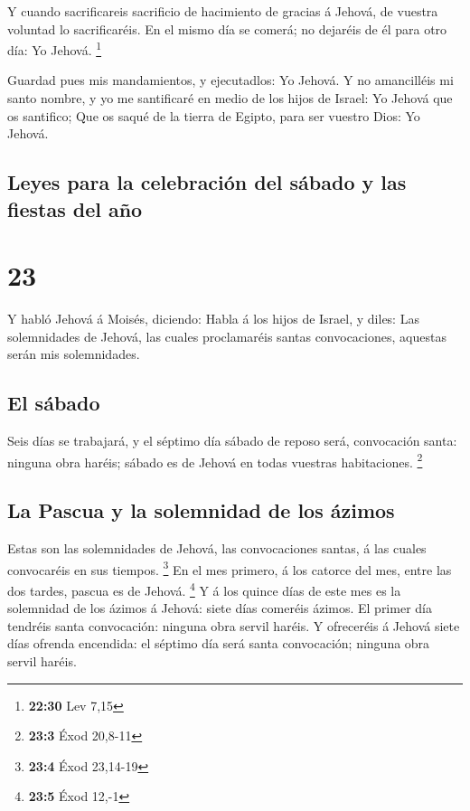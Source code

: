  Y cuando sacrificareis sacrificio de hacimiento de
gracias á Jehová, de vuestra voluntad lo sacrificaréis. 
En el mismo día se comerá; no dejaréis de él para otro día: Yo Jehová.
\footnote{\textbf{22:30} Lev 7,15}

 Guardad pues mis mandamientos, y ejecutadlos: Yo Jehová.
 Y no amancilléis mi santo nombre, y yo me santificaré en
medio de los hijos de Israel: Yo Jehová que os santifico;
 Que os saqué de la tierra de Egipto, para ser vuestro
Dios: Yo Jehová.

\hypertarget{leyes-para-la-celebraciuxf3n-del-suxe1bado-y-las-fiestas-del-auxf1o}{%
\subsection{Leyes para la celebración del sábado y las fiestas del
año}\label{leyes-para-la-celebraciuxf3n-del-suxe1bado-y-las-fiestas-del-auxf1o}}

\hypertarget{section-22}{%
\section{23}\label{section-22}}

 Y habló Jehová á Moisés, diciendo:  Habla á
los hijos de Israel, y diles: Las solemnidades de Jehová, las cuales
proclamaréis santas convocaciones, aquestas serán mis solemnidades.

\hypertarget{el-suxe1bado}{%
\subsection{El sábado}\label{el-suxe1bado}}

 Seis días se trabajará, y el séptimo día sábado de reposo
será, convocación santa: ninguna obra haréis; sábado es de Jehová en
todas vuestras habitaciones. \footnote{\textbf{23:3} Éxod 20,8-11}

\hypertarget{la-pascua-y-la-solemnidad-de-los-uxe1zimos}{%
\subsection{La Pascua y la solemnidad de los
ázimos}\label{la-pascua-y-la-solemnidad-de-los-uxe1zimos}}

 Estas son las solemnidades de Jehová, las convocaciones
santas, á las cuales convocaréis en sus tiempos. \footnote{\textbf{23:4}
  Éxod 23,14-19}  En el mes primero, á los catorce del
mes, entre las dos tardes, pascua es de Jehová. \footnote{\textbf{23:5}
  Éxod 12,-1}  Y á los quince días de este mes es la
solemnidad de los ázimos á Jehová: siete días comeréis ázimos.
 El primer día tendréis santa convocación: ninguna obra
servil haréis.  Y ofreceréis á Jehová siete días ofrenda
encendida: el séptimo día será santa convocación; ninguna obra servil
haréis.

